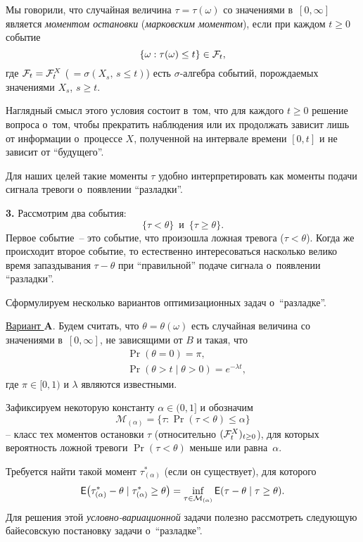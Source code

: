 Мы говорили, что случайная величина $\tau=\tau(\omega)$ со
значениями в~$[0,\infty]$ является \textit{моментом остановки}
(\textit{марковским моментом}), если при каждом $t\ge0$ событие
\begin{equation}
\label{190}%
\{\omega:\tau(\omega)\le t\}\in\F_t,
\end{equation}
где $\mathcal{F}_t=\mathcal{F}_t^X$ ($\,=\sigma(X_s,\,s\le t)$) есть
$\sigma$-алгебра событий, порождаемых значениями $X_s$, $s\ge t$.

Наглядный смысл этого условия состоит в~том, что для каждого
$t\ge0$ решение вопроса о~том, чтобы прекратить наблюдения или их
продолжать зависит лишь от информации о~процессе $X$, полученной
на интервале времени $[0,t]$ и не зависит от ``будущего''.

Для наших целей такие моменты $\tau$ удобно интерпретировать как
моменты подачи сигнала тревоги о~появлении ``разладки''.

\textbf{3.} Рассмотрим два события:
\[
\{\tau<\theta\}\,\mbox{ и }\,\{\tau\ge\theta\}.
\]
Первое событие~-- это событие, что произошла ложная тревога
($\tau<\theta$). Когда же происходит второе событие, то
естественно интересоваться насколько велико время запаздывания
$\tau-\theta$ при ``правильной'' подаче сигнала о~появлении
``разладки''.

Сформулируем несколько вариантов оптимизационных задач
о~``разладке''.

\underline{Вариант $\mathbf{A}$}. Будем считать, что
$\theta=\theta(\omega)$ есть случайная величина со значениями
в~$[0,\infty]$, не зависящими от $B$ и такая, что
\begin{equation}
\label{191}%
\begin{aligned}
& \Pr(\theta=0)=\pi,\\
& \Pr(\theta>t\mid\theta>0)=e^{-\lambda t},
\end{aligned}
\end{equation}
где $\pi\in[0,1)$ и $\lambda$ являются известными.

Зафиксируем некоторую константу $\alpha\in(0,1]$ и обозначим
\[
\mathcal{M}_{(\alpha)}=\{\tau\colon\Pr(\tau<\theta)\le\alpha\}
\]
-- класс тех моментов остановки $\tau$ (относительно
$(\mathcal{F}_t^X)_{t\ge0}$), для которых вероятность ложной тревоги
$\Pr(\tau<\theta)$ меньше или равна~$\alpha$.

Требуется найти такой момент $\tau^*_{(\alpha)}$ (если он
существует), для которого
\begin{equation}
\label{192}%
\E\bigl(\tau_{(\alpha)}^*-\theta\mid\tau_{(\alpha)}^*\ge\theta\bigr)
=\inf_{\tau\in\mathcal{M}_{(\alpha)}}\E(\tau-\theta\mid\tau\ge\theta).
\end{equation}
Для решения этой \textit{условно-вариационной} задачи полезно
рассмотреть следующую байесовскую постановку задачи
о~``разладке''.

